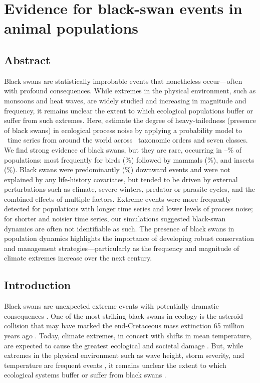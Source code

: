 \chapter[Ecological black swans]{Evidence for black-swan events in animal
  populations\footnotemark[3]}


\section{Abstract}

Black swans are statistically improbable events that nonetheless occur---often
with profound consequences. While extremes in the physical environment, such
as monsoons and heat waves, are widely studied and increasing in magnitude and
frequency, it remains unclear the extent to which ecological populations
buffer or suffer from such extremes. Here, estimate the degree of
heavy-tailedness (presence of black swans) in ecological process noise by
applying a probability model to \NPops~time series from around the world
across \NOrders~taxonomic orders and seven classes. We find strong evidence of
black swans, but they are rare, occurring in
\overallMinPerc--\overallMaxPerc\% of populations: most frequently for birds
(\AvesRangePerc\%) followed by mammals (\MammaliaRangePerc\%), and insects
(\InsectaRangePerc\%). Black swans were predominantly (\percBSDown \%)
downward events and were not explained by any life-history covariates, but
tended to be driven by external perturbations such as climate, severe winters,
predator or parasite cycles, and the combined effects of multiple factors.
Extreme events were more frequently detected for populations with longer time
series and lower levels of process noise; for shorter and noisier time series,
our simulations suggested black-swan dynamics are often not identifiable as
such. The presence of black swans in population dynamics highlights the
importance of developing robust conservation and management
strategies---particularly as the frequency and magnitude of climate extremes
increase over the next century.

\section{Introduction}

Black swans are unexpected extreme events with potentially dramatic
consequences \citep{taleb2007,sornette2009}. One of the most striking black
swans in ecology is the asteroid collision that may have marked the
end-Cretaceous mass extinction 65 million years ago
\citep{alvarez1980,harnik2012}. Today, climate extremes, in concert with
shifts in mean temperature, are expected to cause the greatest ecological and
societal damage \citep{ipcc2012}. But, while extremes in the physical
environment such as wave height, storm severity, and temperature are frequent
events \citep{gaines1993,katz2005}, it remains unclear the extent to which
ecological systems buffer or suffer from black swans \citep{nunez2012}.

